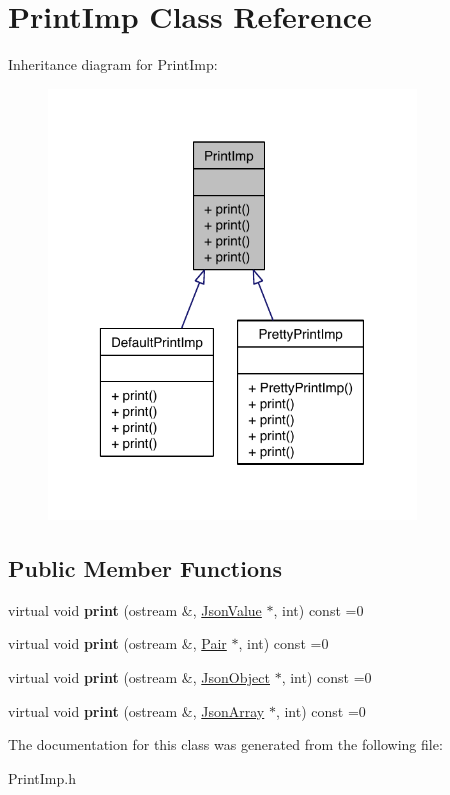 \hypertarget{class_print_imp}{\section{Print\-Imp Class Reference}
\label{class_print_imp}
}


Inheritance diagram for Print\-Imp\-:\nopagebreak
\begin{figure}[H]
\begin{center}
\leavevmode
\includegraphics[width=277pt]{class_print_imp__inherit__graph}
\end{center}
\end{figure}
\subsection*{Public Member Functions}
\begin{DoxyCompactItemize}
\item 
\hypertarget{class_print_imp_a53a04c6deaa6f9203540d53d7cbaf19e}{virtual void {\bfseries print} (ostream \&, \hyperlink{class_json_value}{Json\-Value} $\ast$, int) const =0}\label{class_print_imp_a53a04c6deaa6f9203540d53d7cbaf19e}

\item 
\hypertarget{class_print_imp_a9788d3c8dd520f5fe568927baf85ca93}{virtual void {\bfseries print} (ostream \&, \hyperlink{class_pair}{Pair} $\ast$, int) const =0}\label{class_print_imp_a9788d3c8dd520f5fe568927baf85ca93}

\item 
\hypertarget{class_print_imp_a3df81c573b213d7836d4ba0a34694625}{virtual void {\bfseries print} (ostream \&, \hyperlink{class_json_object}{Json\-Object} $\ast$, int) const =0}\label{class_print_imp_a3df81c573b213d7836d4ba0a34694625}

\item 
\hypertarget{class_print_imp_ab56f3203d139681a195f8e86ee001acc}{virtual void {\bfseries print} (ostream \&, \hyperlink{class_json_array}{Json\-Array} $\ast$, int) const =0}\label{class_print_imp_ab56f3203d139681a195f8e86ee001acc}

\end{DoxyCompactItemize}


The documentation for this class was generated from the following file\-:\begin{DoxyCompactItemize}
\item 
Print\-Imp.\-h\end{DoxyCompactItemize}
